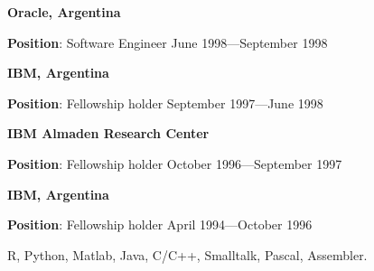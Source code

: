 \documentclass{article}
\begin{document}
\par
\vspace{.1in}
{\bf Oracle, Argentina}
\par
{\bf Position}:  Software Engineer  \hfill June 1998---September 1998

\par
\vspace{.1in}
{\bf IBM, Argentina}
\par
{\bf Position}:  Fellowship holder  \hfill September 1997---June 1998
\par

\vspace{.1in}
{\bf IBM Almaden Research Center}
\nopagebreak
\par
{\bf Position}:  Fellowship holder  \hfill October 1996---September 1997
\nopagebreak
\par

\par
\vspace{.1in}
{\bf IBM, Argentina}
\par
{\bf Position}:  Fellowship holder  \hfill April 1994---October 1996
\par

\vspace{2\baselineskip}
R, Python, Matlab, Java, C/C++, Smalltalk, Pascal, Assembler.
\par
{}
\par
\end{document}
